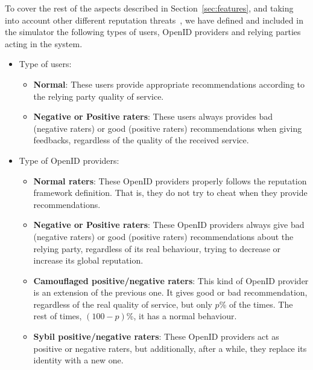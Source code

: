 \documentclass{llncs}
\begin{document}
To cover the rest of the aspects described in Section~\ref{sec:features}, and taking into account other different reputation threats~\cite{trt:2009:gomez-marmol:cose}, we have defined and included in the simulator the following types of users, OpenID providers and relying parties acting in the system.

\begin{itemize}

\item Type of users:
\begin{itemize}
\item \textbf{Normal}: These users provide appropriate
recommendations according to the relying party quality of service.

\item \textbf{Negative or Positive raters}: These users always provides bad (negative raters) or good (positive raters) recommendations when giving feedbacks, regardless of the quality of the received service.



\end{itemize}

\item Type of OpenID providers:
\begin{itemize}
\item \textbf{Normal raters}: These OpenID providers properly follows the reputation framework definition. That is, they do not try to cheat when they provide recommendations.

\item \textbf{Negative or Positive raters}: These OpenID providers
always give bad (negative raters) or good (positive raters) recommendations about the relying party, regardless of its real behaviour, trying to decrease or increase its global reputation.



\item \textbf{Camouflaged positive/negative raters}: This kind of OpenID
provider is an extension of the previous one. It gives good or bad
recommendation, regardless of the real quality of service, but only
$p$\% of the times. The rest of times, $(100-p)$\%, it has a
normal behaviour.

\item \textbf{Sybil positive/negative raters}: These OpenID
providers act as positive or negative raters, but additionally, after a while, they replace its identity with a new one. 
\end{itemize}


\end{itemize}
\end{document}
